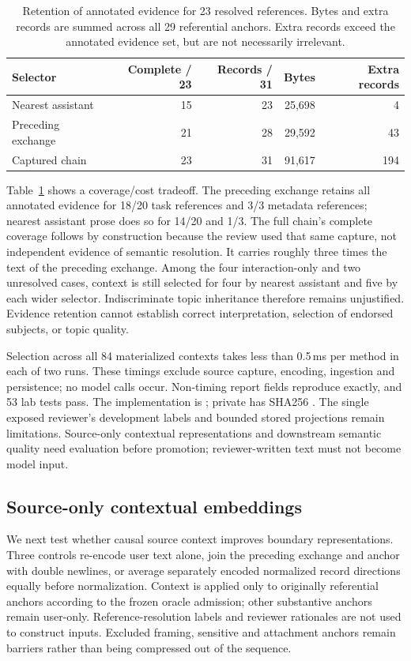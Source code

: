 \documentclass[11pt]{article}
\begin{document}
\begin{table}[ht]
\centering
\begin{tabular}{lrrrr}
\hline
Selector & Complete / 23 & Records / 31 & Bytes & Extra records \\
\hline
Nearest assistant & 15 & 23 & 25,698 & 4 \\
Preceding exchange & 21 & 28 & 29,592 & 43 \\
Captured chain & 23 & 31 & 91,617 & 194 \\
\hline
\end{tabular}
\caption{Retention of annotated evidence for 23 resolved references. Bytes and
extra records are summed across all 29 referential anchors. Extra records exceed
the annotated evidence set, but are not necessarily irrelevant.}
\label{tab:context-selection}
\end{table}

Table~\ref{tab:context-selection} shows a coverage/cost tradeoff. The preceding
exchange retains all annotated evidence for 18/20 task references and 3/3
metadata references; nearest assistant prose does so for 14/20 and 1/3.
The full chain's complete coverage follows by construction because the review
used that same capture, not independent evidence of semantic resolution.
It carries roughly three times the text of the preceding exchange. Among the
four interaction-only and two unresolved cases, context is still selected for
four by nearest assistant and five by each wider selector. Indiscriminate topic
inheritance therefore remains unjustified. Evidence retention cannot establish
correct interpretation, selection of endorsed subjects, or topic quality.

Selection across all 84 materialized contexts takes less than 0.5\,ms per
method in each of two runs. These timings exclude source capture, encoding,
ingestion and persistence; no model calls occur. Non-timing report fields
reproduce exactly, and 53 lab tests pass. The implementation is
; private
 has SHA256
.
The single exposed reviewer's development labels and bounded stored projections
remain limitations. Source-only contextual representations and downstream
semantic quality need evaluation before promotion; reviewer-written text must
not become model input.

\subsection{Source-only contextual embeddings}
We next test whether causal source context improves boundary representations.
Three controls re-encode user text alone, join the preceding exchange and anchor
with double newlines, or average separately encoded normalized record directions
equally before normalization. Context is applied only to originally referential
anchors according to the frozen oracle admission; other substantive anchors
remain user-only. Reference-resolution labels and reviewer rationales are not
used to construct inputs. Excluded framing, sensitive and attachment anchors
remain barriers rather than being compressed out of the sequence.
\end{document}
